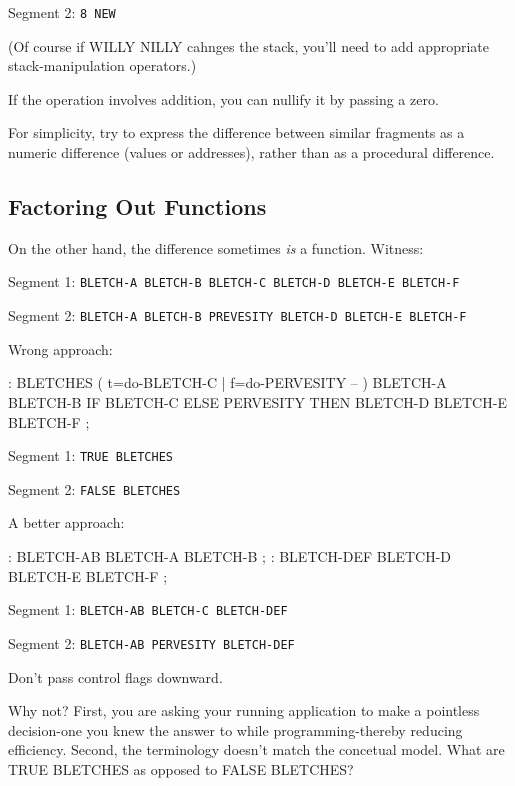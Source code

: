 Segment 2:    \texttt{8 NEW}

\bigskip

\noindent 
(Of course if WILLY NILLY cahnges the stack, you'll need to add appropriate stack-manipulation operators.)

If the operation involves addition, you can nullify it by passing a zero.

\begin{tip}
For simplicity, try to express the difference between similar fragments as a numeric difference (values or addresses), rather than as a procedural difference.
\end{tip}


\subsection{{Factoring Out Functions}}
On the other hand, the difference sometimes \emph{is} a function. Witness:

\bigskip


Segment 1:	\texttt{BLETCH-A BLETCH-B BLETCH-C BLETCH-D BLETCH-E BLETCH-F}

Segment 2:	\texttt{BLETCH-A BLETCH-B PREVESITY BLETCH-D BLETCH-E BLETCH-F}

\bigskip

\noindent
Wrong approach:

\begin{Code}
: BLETCHES ( t=do-BLETCH-C | f=do-PERVESITY -- ) 
   BLETCH-A BLETCH-B IF BLETCH-C ELSE PERVESITY 
      THEN BLETCH-D BLETCH-E BLETCH-F ;
\end{Code}

\noindent 
Segment 1:	\texttt{TRUE BLETCHES}

\noindent
Segment 2:	\texttt{FALSE BLETCHES}

\bigskip

\noindent 
A better approach:

\begin{Code}
: BLETCH-AB BLETCH-A BLETCH-B ;
: BLETCH-DEF BLETCH-D BLETCH-E BLETCH-F ;
\end{Code}

\indent Segment 1:	\texttt{BLETCH-AB BLETCH-C BLETCH-DEF}

\indent Segment 2:	\texttt{BLETCH-AB PERVESITY BLETCH-DEF}

\begin{tip}
Don't pass control flags downward.
\end{tip}
Why not? First, you are asking your running application to make a pointless decision-one you knew the answer to while programming-thereby reducing efficiency. Second, the terminology doesn't match the concetual model. What are TRUE BLETCHES as opposed to FALSE BLETCHES?

